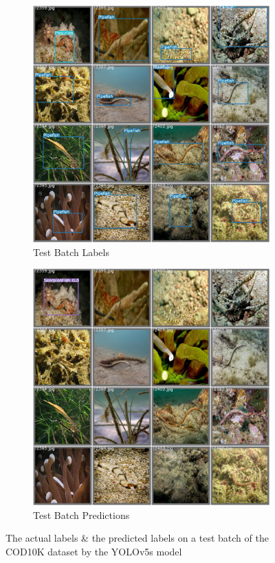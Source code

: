 \documentclass[conference]{IEEEtran}
\begin{document}
\begin{figure}[ht]
\centering
\begin{subfigure}{0.7\linewidth}
    \includegraphics[width=1\textwidth]{Experiments/COD10K/test_batch2_labels.jpg}
    \caption{Test Batch Labels}
    \label{fig:cod10k_label}
\end{subfigure}
\hfill
\begin{subfigure}{0.7\linewidth}
    \includegraphics[width=1\textwidth]{Experiments/COD10K/test_batch2_pred.jpg}
    \caption{Test Batch Predictions}
    \label{fig:cod10k_pred}
\end{subfigure}
\caption{The actual labels \& the predicted labels on a test batch of the COD10K dataset by the YOLOv5s model}
\label{fig11}
\end{figure}
\newpage
\end{document}
